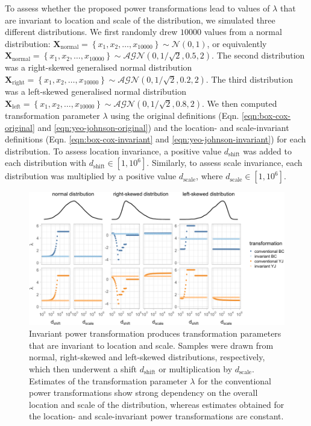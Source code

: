 \documentclass[preprint,12pt,authoryear]{elsarticle}
\begin{document}
To assess whether the proposed power transformations lead to values of
\(\lambda\) that are invariant to location and scale of the
distribution, we simulated three different distributions. We first
randomly drew \(10000\) values from a normal distribution:
\(\mathbf{X}_{\text{normal}} = \left\{x_1, x_2, \ldots, x_{10000} \right\} \sim \mathcal{N}\left(0, 1\right)\),
or equivalently
\(\mathbf{X}_{\text{normal}} = \left\{x_1, x_2, \ldots, x_{10000} \right\} \sim \mathcal{AGN}\left(0, 1/\sqrt{2}, 0.5, 2\right)\).
The second distribution was a right-skewed generalised normal
distribution
\(\mathbf{X}_{\text{right}} = \left\{x_1, x_2, \ldots, x_{10000} \right\} \sim \mathcal{AGN}\left(0, 1/\sqrt{2}, 0.2, 2\right)\).
The third distribution was a left-skewed generalised normal distribution
\(\mathbf{X}_{\text{left}} = \left\{x_1, x_2, \ldots, x_{10000} \right\} \sim \mathcal{AGN}\left(0, 1/\sqrt{2}, 0.8, 2\right)\).
We then computed transformation parameter \(\lambda\) using the original
definitions (Eqn. \ref{eqn:box-cox-original} and
\ref{eqn:yeo-johnson-original}) and the location- and scale-invariant
definitions (Eqn. \ref{eqn:box-cox-invariant} and
\ref{eqn:yeo-johnson-invariant}) for each distribution. To assess
location invariance, a positive value \(d_{\text{shift}}\) was added to
each distribution with \(d_{\text{shift}} \in [1, 10^6]\). Similarly, to
assess scale invariance, each distribution was multiplied by a positive
value \(d_{\text{scale}}\), where \(d_{\text{scale}} \in [1, 10^6]\).

\begin{figure}

{\centering \includegraphics{figure_3} 

}

\caption{Invariant power transformation produces transformation parameters that are invariant to location and scale. Samples were drawn from normal, right-skewed and left-skewed distributions, respectively, which then underwent a shift $d_{\text{shift}}$ or multiplication by $d_{\text{scale}}$. Estimates of the transformation parameter $\lambda$ for the conventional power transformations show strong dependency on the overall location and scale of the distribution, whereas estimates obtained for the location- and scale-invariant power transformations are constant.}\label{fig:shifted-distributions}
\end{figure}
\end{document}
